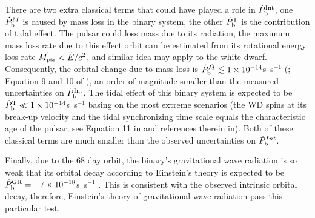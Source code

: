 There are two extra classical terms that could have played a role in
$\dot{P}_{\rm b}^{\rm Int}$, one $\dot{P}_{\rm b}^{\dot{M}}$ is caused by mass loss in the
binary system, the other $ \dot{P}_{\rm b}^{\rm T}$ is the contribution of tidal effect.
The pulsar could loss mass due to its radiation, the maximum mass loss rate
due to this effect orbit can be estimated from its rotational energy loss rate
$\dot{M_{\rm psr}}<\dot{E}/c^2$, and similar idea may apply to the white
dwarf. 
Consequently, the orbital change due to mass loss is $\dot{P}_{\rm
b}^{\dot{M}}\lesssim 1\times10^{-14}$s~s$^{-1}$ (\citealt{dt91}; Equation 9 and 10
of \citealt{fwe+12}), an order of magnitude smaller than the measured
uncertainties on $\dot{P}_{\rm b}^{\rm Int}$.
The tidal effect of this binary system is expected to be $\dot{P}_{\rm b}^{\rm
T}\ll1\times10^{-14}$s~s$^{-1}$ basing on the most extreme scenarios (the WD spins at
its break-up velocity and the tidal synchronizing time scale equals the
characteristic age of the pulsar; see Equation 11 in \citealt{fwe+12} and
references therein in).
Both of these classical terms are much smaller than the observed uncertainties
on $\dot{P}_{\rm b}^{Int}$.


Finally, due to the 68 day orbit, the binary's  gravitational wave
radiation is so weak that its orbital decay according to Einstein's
theory is expected to be 
$\dot{P}_{\rm b}^{\rm GR} = -7\times10^{-18}$s~s$^{-1}$ \citep{lk05}.
This is consistent with the observed intrinsic orbital decay, therefore,
Einstein's theory of gravitational wave radiation pass this particular test.


